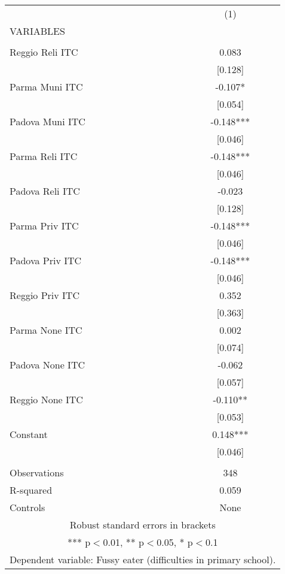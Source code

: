 \begin{tabular}{lc} \hline
 & (1) \\
VARIABLES &  \\ \hline
 &  \\
Reggio Reli ITC & 0.083 \\
 & [0.128] \\
Parma Muni ITC & -0.107* \\
 & [0.054] \\
Padova Muni ITC & -0.148*** \\
 & [0.046] \\
Parma Reli ITC & -0.148*** \\
 & [0.046] \\
Padova Reli ITC & -0.023 \\
 & [0.128] \\
Parma Priv ITC & -0.148*** \\
 & [0.046] \\
Padova Priv ITC & -0.148*** \\
 & [0.046] \\
Reggio Priv ITC & 0.352 \\
 & [0.363] \\
Parma None ITC & 0.002 \\
 & [0.074] \\
Padova None ITC & -0.062 \\
 & [0.057] \\
Reggio None ITC & -0.110** \\
 & [0.053] \\
Constant & 0.148*** \\
 & [0.046] \\
 &  \\
Observations & 348 \\
R-squared & 0.059 \\
 Controls & None \\ \hline
\multicolumn{2}{c}{ Robust standard errors in brackets} \\
\multicolumn{2}{c}{ *** p$<$0.01, ** p$<$0.05, * p$<$0.1} \\
\multicolumn{2}{c}{ Dependent variable: Fussy eater (difficulties in primary school).} \\
\end{tabular}
